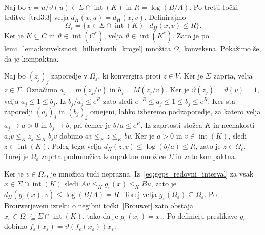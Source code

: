 \documentclass[mat2, tisk]{fmfdelo}
\begin{document}
\begin{dokaz}
  Naj bo $v=u/\vartheta(u)\in\Sigma\cap\operatorname{int}(K)$ in
  $R=\log(B/A)$. Po tretji točki trditve~\ref{trd3.3} velja
  $d_H(x,u)=d_H(x,v)$. Definirajmo
  \[
  \Omega_\varepsilon=\{x\in\Sigma\cap\operatorname{int}(K)
  ~|~d_H(x,v)\leq R\}.
  \]
  Ker je $K\subseteq C$ in $\vartheta\in\operatorname{int}(C^*)$,
  velja $\vartheta\in\operatorname{int}(K^*)$.
  Zato je po lemi~\ref{lema:konveksnost_hilbertovih_krogel}
  množica $\Omega_\varepsilon$ konveksna. Pokažimo še, da je kompaktna.

  Naj bo $(z_j)_j$ zaporedje v $\Omega_\varepsilon$, ki konvergira
  proti $z\in V$. Ker je $\Sigma$ zaprta, velja $z\in\Sigma$.
  Označimo $a_j=m(z_j/v)$ in $b_j=M(z_j/v)$.
  Ker je $\vartheta(z_j)=\vartheta(v)=1$, velja
  $a_j\leq1\leq b_j$. Iz $b_j/a_j\leq e^R$ zato sledi
  $e^{-R}\leq a_j\leq1\leq b_j\leq e^R$.
  Ker sta zaporedji $(a_j)_j$ in $(b_j)_j$ omejeni,
  lahko izberemo podzaporedje, za katero velja
  $a_j\to a>0$ in $b_j\to b$, pri čemer je $b/a\leq e^R$.
  Iz zaprtosti stožca $K$ in neenakosti
  $a_jv\leq_K z_j\leq_K b_j v$ dobimo
  $av\leq_K z\leq_K bv$.
  Ker je $a>0$ in $v\in\operatorname{int}(K)$, sledi
  $z\in\operatorname{int}(K)$. Poleg tega velja
  $d_H(z,v)\leq\log(b/a)\leq R$, zato je
  $z\in\Omega_\varepsilon$.
  Torej je $\Omega_\varepsilon$ zaprta podmnožica
  kompaktne množice $\Sigma$ in zato kompaktna.

  Ker je $v\in\Omega_\varepsilon$, je množica tudi neprazna.
  Iz~\eqref{eq:geps_redovni_interval} za vsak
  $x\in\Sigma\cap\operatorname{int}(K)$ sledi
  $Au\leq_K g_\varepsilon(x)\leq_K Bu$, zato je
  $d_H(g_\varepsilon(x),v)\leq\log(B/A)=R$.
  Torej velja
  $g_\varepsilon(\Omega_\varepsilon)\subseteq\Omega_\varepsilon$.
  Po Brouwerjevem izreku o negibni točki~\ref{Brouwer} zato obstaja
  $x_\varepsilon\in\Omega_\varepsilon
  \subseteq\Sigma\cap\operatorname{int}(K)$, tako da je
  $g_\varepsilon(x_\varepsilon)=x_\varepsilon$. Po definiciji preslikave $g_\varepsilon$ dobimo 
  $f_\varepsilon(x_\varepsilon)= \vartheta (f_\varepsilon(x_\varepsilon)) x_\varepsilon$.


\end{dokaz}
\end{document}
